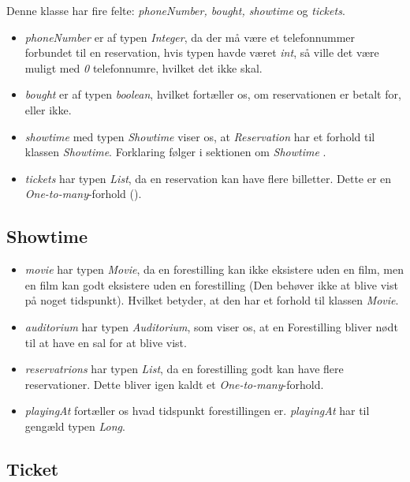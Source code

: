 Denne klasse har fire felte: \textit{phoneNumber, bought, showtime} og \textit{tickets}.

\begin{itemize}
  \item \textit{phoneNumber} er af typen \textit{Integer}, da der må være et telefonnummer forbundet til en reservation, hvis typen havde været \textit{int}, så ville det være muligt med \textit{0} telefonnumre, hvilket det ikke skal.
  \item \textit{bought} er af typen \textit{boolean}, hvilket fortæller os, om reservationen er betalt for, eller ikke. 
  \item \textit{showtime} med typen \textit{Showtime} viser os, at \textit{Reservation} har et forhold til klassen \textit{Showtime}. Forklaring følger i sektionen om \textit{Showtime} .
  \item \textit{tickets} har typen \textit{List}, da en reservation kan have flere billetter. Dette er en \textit{One-to-many}-forhold (\cite{https://learnit.itu.dk/pluginfile.php/114939/mod_resource/content/0/GRPRO-14.pdf}).

\end{itemize}

\subsection{Showtime}

\begin{itemize}
  \item \textit{movie} har typen \textit{Movie}, da en forestilling kan ikke eksistere uden en film, men en film kan godt eksistere uden en forestilling (Den behøver ikke at blive vist på noget tidspunkt). Hvilket betyder, at den har et forhold til klassen \textit{Movie}.
  \item \textit{auditorium} har typen \textit{Auditorium}, som viser os, at en Forestilling bliver nødt til at have en sal for at blive vist. 
  \item \textit{reservatrions} har typen \textit{List}, da en forestilling godt kan have flere reservationer. Dette bliver igen kaldt et \textit{One-to-many}-forhold.
  \item \textit{playingAt} fortæller os hvad tidspunkt forestillingen er. \textit{playingAt} har til gengæld typen \textit{Long}. 
\end{itemize}

\subsection{Ticket}

